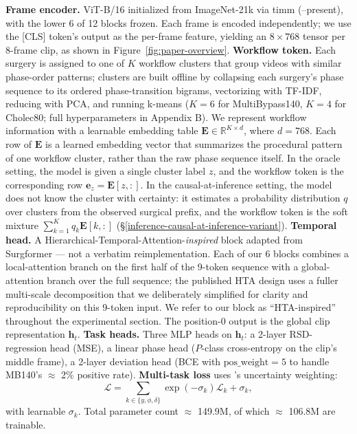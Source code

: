 \textbf{Frame encoder.} ViT-B/16 \citep{dosovitskiy2021vit} initialized
from ImageNet-21k via timm (\citealt{wightman2019timm}--present), with the lower 6
of 12 blocks frozen. Each frame is encoded independently; we use the
{[}CLS{]} token's output as the per-frame feature, yielding an
\(8 \times 768\) tensor per 8-frame clip, as shown in Figure~\ref{fig:paper-overview}. \textbf{Workflow token.} Each surgery
is assigned to one of \(K\) workflow clusters that group videos with
similar phase-order patterns; clusters are built offline by collapsing
each surgery's phase sequence to its ordered phase-transition bigrams,
vectorizing with TF-IDF, reducing with PCA, and running k-means
(\(K = 6\) for MultiBypass140, \(K = 4\) for Cholec80; full
hyperparameters in Appendix B). We represent workflow information with a
learnable embedding table \(\mathbf{E} \in
\mathbb{R}^{K \times d}\), where \(d = 768\). Each row of \(\mathbf{E}\)
is a learned embedding vector that summarizes the procedural pattern of
one workflow cluster, rather than the raw phase sequence itself. In the
oracle setting, the model is given a single cluster label \(z\), and the
workflow token is the corresponding row
\(\mathbf{e}_z = \mathbf{E}[z, :]\). In the causal-at-inference setting,
the model does not know the cluster with certainty: it estimates a
probability distribution \(q\) over clusters from the observed surgical
prefix, and the workflow token is the soft mixture
\(\sum_{k=1}^K q_k \mathbf{E}[k, :]\)
(\S\ref{inference-causal-at-inference-variant}). \textbf{Temporal head.} A
Hierarchical-Temporal-Attention-\emph{inspired} block adapted from
Surgformer \citep{yang2024surgformer} --- not a verbatim reimplementation. Each
of our 6 blocks combines a local-attention branch on the first half of
the 9-token sequence with a global-attention branch over the full
sequence; the published HTA design uses a fuller multi-scale
decomposition that we deliberately simplified for clarity and
reproducibility on this 9-token input. We refer to our block as
``HTA-inspired'' throughout the experimental section. The position-0
output is the global clip representation \(\mathbf{h}_t\). \textbf{Task
heads.} Three MLP heads on \(\mathbf{h}_t\): a 2-layer RSD-regression
head (MSE), a linear phase head (\(P\)-class cross-entropy on the clip's
middle frame), a 2-layer deviation head (BCE with
\(\text{pos\_weight} = 5\) to handle MB140's $\approx$ 2\% positive rate).
\textbf{Multi-task loss} uses \citet{kendall2018multitask}'s uncertainty
weighting: \[
\mathcal{L} = \sum_{k \in \{y, \phi, \delta\}} \exp(-\sigma_k) \mathcal{L}_k + \sigma_k,
\] with learnable \(\sigma_k\). Total parameter count $\approx$ 149.9M, of which
$\approx$ 106.8M are trainable.

